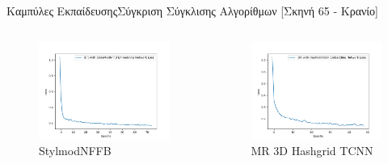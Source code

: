 \documentclass[10pt]{beamer}
\begin{document}
\begin{frame}{Καμπύλες Εκπαίδευσης}{Σύγκριση Σύγκλισης Αλγορίθμων [Σκηνή 65 - Κρανίο]}
\begin{columns}[T]
    \end{columns}
    \begin{columns}[T]
         \begin{figure}
            \includegraphics[height = .2\textheight]{images/chapter5_img/LossPlots/Total_Loss_First_50-100_Epochs/loss_plot_StyleModNFFB_EpochStamp75.jpg}
            \caption{StylmodNFFB}
            \end{figure}
             \begin{figure}
            \includegraphics[height = .2\textheight]{images/chapter5_img/LossPlots/Total_Loss_First_50-100_Epochs/loss_plot_HashGridTcnn_EpochStamp49.jpg}
            \caption{MR 3D Hashgrid TCNN}

\end{figure}
\end{columns}
\end{frame}
\end{document}
